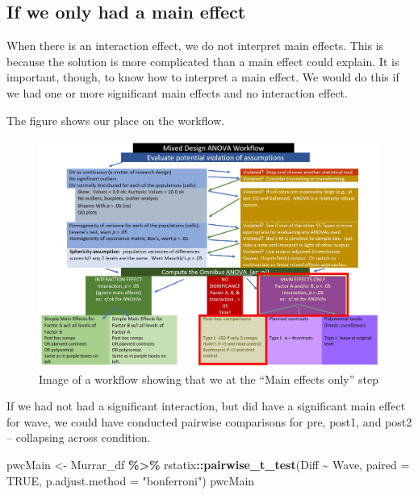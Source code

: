 \documentclass[
  11pt,
]{book}
\newenvironment{Shaded}{\begin{snugshade}}{\end{snugshade}}
\newcommand{\AttributeTok}[1]{\textcolor[rgb]{0.27,0.27,0.27}{#1}}
\newcommand{\ConstantTok}[1]{\textcolor[rgb]{0.37,0.37,0.37}{#1}}
\newcommand{\FunctionTok}[1]{\textcolor[rgb]{0.27,0.27,0.27}{\textbf{#1}}}
\newcommand{\NormalTok}[1]{#1}
\newcommand{\OtherTok}[1]{\textcolor[rgb]{0.37,0.37,0.37}{#1}}
\newcommand{\SpecialCharTok}[1]{\textcolor[rgb]{0.43,0.43,0.43}{\textbf{#1}}}
\newcommand{\StringTok}[1]{\textcolor[rgb]{0.5,0.5,0.5}{#1}}
\begin{document}
\hypertarget{if-we-only-had-a-main-effect}{%
\subsection{If we only had a main effect}\label{if-we-only-had-a-main-effect}}

When there is an interaction effect, we do not interpret main effects. This is because the solution is more complicated than a main effect could explain. It is important, though, to know how to interpret a main effect. We would do this if we had one or more significant main effects and no interaction effect.

The figure shows our place on the workflow.

\begin{figure}
\centering
\includegraphics{images/mixed/mx_main.jpg}
\caption{Image of a workflow showing that we at the ``Main effects only'' step}
\end{figure}

If we had not had a significant interaction, but did have a significant main effect for wave, we could have conducted pairwise comparisons for pre, post1, and post2 -- collapsing across condition.

\begin{Shaded}
\begin{Highlighting}[]
\NormalTok{pwcMain }\OtherTok{\textless{}{-}}\NormalTok{ Murrar\_df }\SpecialCharTok{\%\textgreater{}\%}
\NormalTok{    rstatix}\SpecialCharTok{::}\FunctionTok{pairwise\_t\_test}\NormalTok{(Diff }\SpecialCharTok{\textasciitilde{}}\NormalTok{ Wave, }\AttributeTok{paired =} \ConstantTok{TRUE}\NormalTok{, }\AttributeTok{p.adjust.method =} \StringTok{"bonferroni"}\NormalTok{)}
\NormalTok{pwcMain}
\end{Highlighting}
\end{Shaded}
\end{document}
